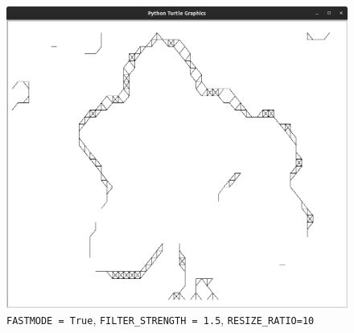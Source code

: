 \documentclass{article}
\begin{document}
\begin{figure}[H]
\centering
\includegraphics[width=\textwidth]{./simple10.png}
\caption{
\texttt{FASTMODE\ =\ True}, \texttt{FILTER\_STRENGTH\ =\ 1.5},
\texttt{RESIZE\_RATIO=10}
}
\end{figure} 
\end{document}
